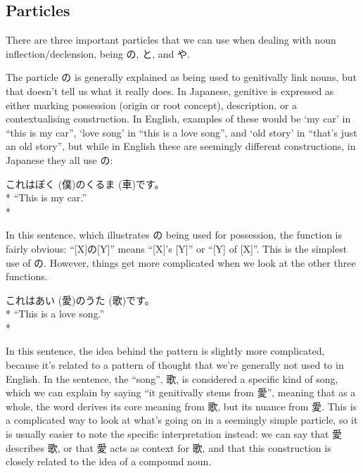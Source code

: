 \documentclass[11pt, b5paper, twoside, openright, onecolumn]{book}
\makeatletter
\newcommand*{\rubystack}[2]{{\relscale{0.5}%
  \begin{tabular}[b]{@{}c@{}}%
    {#1}\\%
   {\textscale{2}{#2}}%
  \end{tabular}}%
}
\DeclareRobustCommand*{\ruby}[2]{%
  \mbox{%
    \setlength{\parskip}{0ex}%
    \BeginAccSupp{method=pdfstringdef,ActualText={#1}}%
      \rubystack{\phantom{#2}}{#1}%
      \llap{%
        \rubystack{#2}{\phantom{#1}}%
      }%
    \EndAccSupp{}%
  }%
}
\renewcommand*{\ruby}[2]{#2 (#1)}%
\newenvironment{exampleblock}{
\setlength{\parindent}{0.6in}
\begin{minipage}[t]{\dimexpr\textwidth-\parindent}}
{\end{minipage}}
\makeatother
\begin{document}
\subsection{Particles}

There are three important particles that we can use when dealing with noun inflection/declension‚ being の‚ と‚ and や.

The particle の is generally explained as being used to genitivally link nouns‚ but that doesn’t tell us what it really does. In Japanese‚ genitive is expressed as either marking possession (origin or root concept)‚ description‚ or a contextualising construction. In English‚ examples of these would be ‘my car’ in “this is my car”‚ ‘love song’ in “this is a love song”‚ and ‘old story’ in “that’s just an old story”‚ but while in English these are seemingly different constructions‚ in Japanese they all use の:

\vspace{0.4cm}
\begin{exampleblock}
これは\ruby{僕}{ぼく}の\ruby{車}{くるま}です。 \\* 
“This is my car.” \\* 
\end{exampleblock}
\vspace{0.2cm}

In this sentence‚ which illustrates の being used for possession‚ the function is fairly obvious: “[X]の[Y]” means “[X]’s [Y]” or “[Y] of [X]”. This is the simplest use of の. However‚ things get more complicated when we look at the other three functions.

\vspace{0.4cm}
\begin{exampleblock}
これは\ruby{愛}{あい}の\ruby{歌}{うた}です。 \\* 
“This is a love song.” \\* 
\end{exampleblock}
\vspace{0.2cm}

In this sentence‚ the idea behind the pattern is slightly more complicated‚ because it’s related to a pattern of thought that we’re generally not used to in English. In the sentence‚ the “song”‚ 歌‚ is considered a specific kind of song‚ which we can explain by saying “it genitivally stems from 愛”‚ meaning that as a whole‚ the word derives its core meaning from 歌‚ but its nuance from 愛. This is a complicated way to look at what’s going on in a seemingly simple particle‚ so it is usually easier to note the specific interpretation instead: we can say that 愛 describes 歌‚ or that 愛 acts as context for 歌‚ and that this construction is closely related to the idea of a compound noun.
\end{document}
